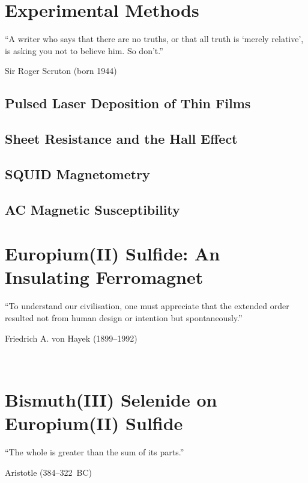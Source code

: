 ﻿\documentclass{report}
\begin{document}
\chapter{Experimental Methods}\label{ch:methods}%
\begin{refsection}   
\epigraph{``A writer who says that there are no truths, or that all truth is `merely relative', is asking you not to believe him. So don't.''}{Sir Roger Scruton (born 1944)}
    \section{Pulsed Laser Deposition of Thin Films}\label{sec:pld}
		
    \section{Sheet Resistance and the Hall Effect}
		
    \section{SQUID Magnetometry}\label{sec:squid}
        
    \section{AC Magnetic Susceptibility}\label{sec:acm}
        
    \printbibliography[heading=subbibintoc, title=References for Chapter~\thechapter]
\end{refsection} 


\chapter{Europium(II) Sulfide: An Insulating Ferromagnet}\label{ch:EuS}
\begin{refsection}
\epigraph{``To understand our civilisation, one must appreciate that the extended order resulted not from human design or intention but spontaneously.''}{Friedrich A. von Hayek (1899--1992)}~\\
    
    \printbibliography[heading=subbibintoc, title=References for Chapter~\thechapter]
\end{refsection} 

\chapter{Bismuth(III) Selenide on Europium(II) Sulfide}\label{ch:bilayer2014}
\begin{refsection} 
\epigraph{``The whole is greater than the sum of its parts.''}{Aristotle (384--322~BC)}~\\
    
    \printbibliography[heading=subbibintoc, title=References for Chapter~\thechapter]
\end{refsection} 
\end{document}
